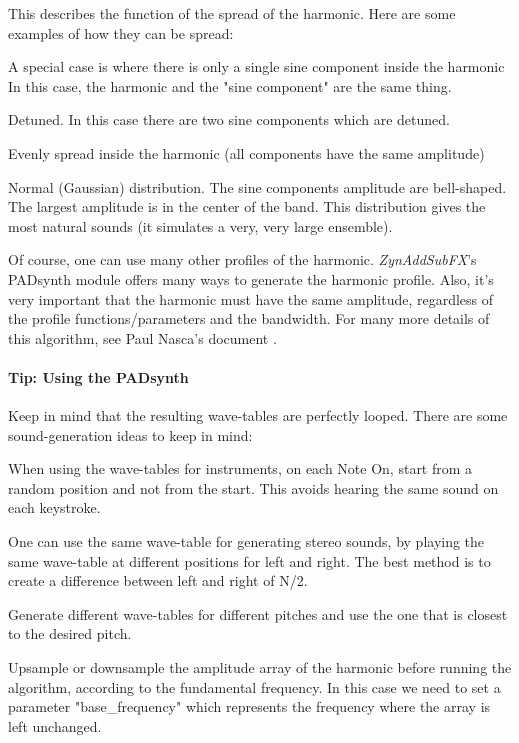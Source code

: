    This describes the function of the spread of the harmonic.
   Here are some examples of how they can be spread:

   \begin{enumber}
      \item  A special case is where there is only a single sine component
         inside the harmonic In this case, the harmonic and the "sine
         component" are the same thing.
      \item  Detuned. In this case there are two sine components which are
         detuned.
      \item  Evenly spread inside the harmonic (all components have the same
         amplitude)
      \item  Normal (Gaussian) distribution. The sine components amplitude are
         bell-shaped. The largest amplitude is in the center of the band. This
         distribution gives the most natural sounds (it simulates a very, very
         large ensemble).
   \end{enumber}

   Of course, one can use many other profiles of the harmonic.
   \textsl{ZynAddSubFX}'s PADsynth module offers many ways to generate the
   harmonic profile.  Also, it's very important that the harmonic must have the
   same amplitude, regardless of the profile functions/parameters and the
   bandwidth.
   For many more details of this algorithm, see Paul Nasca's document
   \cite{zyndoc}.

\paragraph{Tip: Using the PADsynth}
\label{tips_using_the_padsynth}

   Keep in mind that the resulting wave-tables are perfectly looped.
   There are some sound-generation ideas to keep in mind:

   \begin{enumber}
      \item When using the wave-tables for instruments, on each Note On, start
         from a random position and not from the start. This avoids hearing the
         same sound on each keystroke.
      \item One can use the same wave-table for generating stereo sounds, by
         playing the same wave-table at different positions for left and right.
         The best method is to create a difference between left and
         right of N/2.
      \item Generate different wave-tables for different pitches and use the
         one that is closest to the desired pitch.
      \item Upsample or downsample the amplitude array of the harmonic before
         running the algorithm, according to the fundamental frequency. In this
         case we need to set a parameter "base\_frequency" which represents the
         frequency where the array is left unchanged.
   \end{enumber}

